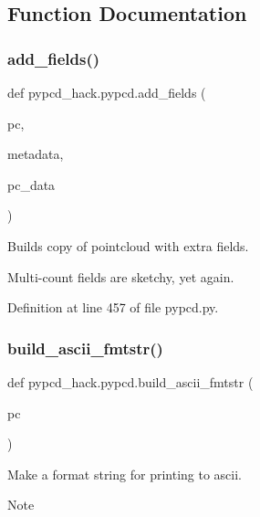 \subsection{Function Documentation}
\mbox{\label{namespacepypcd__hack_1_1pypcd_a82ac240d16f3519a9a4984a0e0b44c9a}} 
\subsubsection{\texorpdfstring{add\+\_\+fields()}{add\_fields()}}
{\footnotesize\ttfamily def pypcd\+\_\+hack.\+pypcd.\+add\+\_\+fields (\begin{DoxyParamCaption}\item[{}]{pc,  }\item[{}]{metadata,  }\item[{}]{pc\+\_\+data }\end{DoxyParamCaption})}

\begin{DoxyVerb}Builds copy of pointcloud with extra fields.

Multi-count fields are sketchy, yet again.
\end{DoxyVerb}
 

Definition at line 457 of file pypcd.\+py.

\mbox{\label{namespacepypcd__hack_1_1pypcd_a6aa9a1eb4d943a7ea0cbd73bc7945ddf}} 
\subsubsection{\texorpdfstring{build\+\_\+ascii\+\_\+fmtstr()}{build\_ascii\_fmtstr()}}
{\footnotesize\ttfamily def pypcd\+\_\+hack.\+pypcd.\+build\+\_\+ascii\+\_\+fmtstr (\begin{DoxyParamCaption}\item[{}]{pc }\end{DoxyParamCaption})}

\begin{DoxyVerb}Make a format string for printing to ascii.

Note %
\end{DoxyVerb}
 

